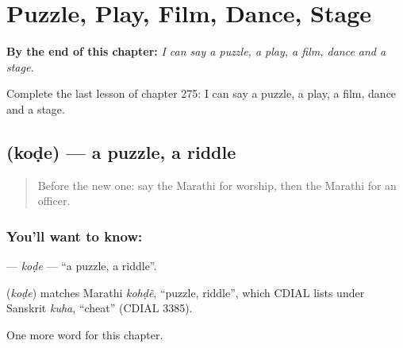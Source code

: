 
\chapter{Puzzle, Play, Film, Dance, Stage}
\label{ch:mr-puzzle-play-film-dance-stage}

\begin{chapteropening}
\textbf{By the end of this chapter:} \emph{I can say a puzzle, a play, a film, dance and a stage.}

Complete the last lesson of chapter 275: I can say a puzzle, a play, a film, dance and a stage.
\end{chapteropening}

\section[\texorpdfstring{\mr{कोडे} (koḍe)}{कोडे (koḍe)}]{ (koḍe) — a puzzle, a riddle}

\label{lesson:MR-C275-kode}



\begin{quote}
Before the new one: say the Marathi for worship, then the Marathi for an officer.
\end{quote}

\subsection*{You'll want to know: }
\textbf{} — \emph{koḍe} — \textquotedblleft{}a puzzle, a riddle\textquotedblright{}.

\begin{cousinweb}
\textbf{} (\emph{koḍe}) matches Marathi \emph{kohḍẽ}, \textquotedblleft{}puzzle, riddle\textquotedblright{}, which CDIAL lists under Sanskrit \emph{kuha}, \textquotedblleft{}cheat\textquotedblright{} (CDIAL 3385).
\end{cousinweb}

\begin{grammarlens}[title={What you've built}]
One more word for this chapter.
\end{grammarlens}

